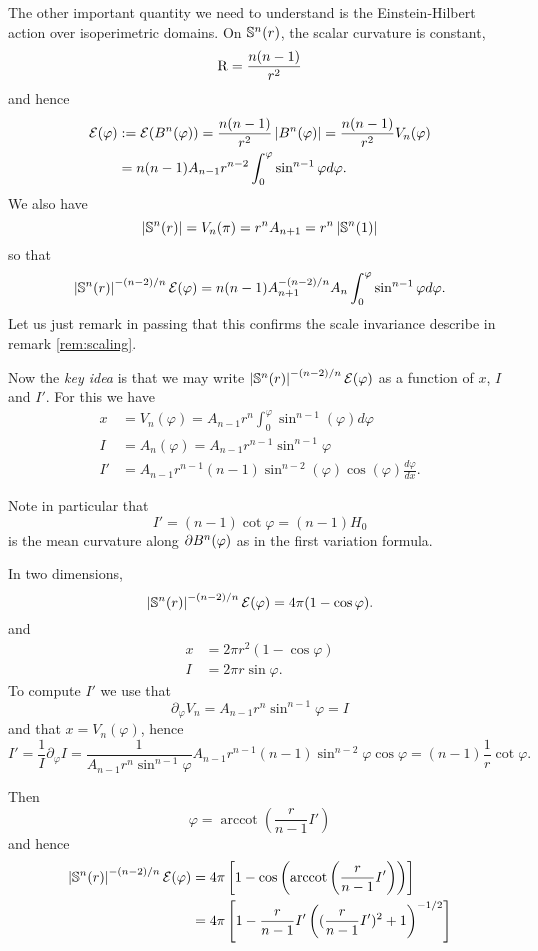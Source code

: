 \documentclass{amsart}
\begin{document}
The other important quantity we need to understand is the Einstein-Hilbert action over isoperimetric domains. On \(\S^n(r)\), the scalar curvature is constant,
\[
\Sc = \frac{n(n-1)}{r^2}
\]
and hence
\[
\begin{split}
\einsteinhilbert(\varphi) &:= \einsteinhilbert(B^n(\varphi)) = \frac{n(n-1)}{r^2} \abs{B^n(\varphi)} = \frac{n(n-1)}{r^2} V_n(\varphi) \\
&= n(n-1) A_{n-1} r^{n-2} \int_0^{\varphi} \sin^{n-1} \varphi d\varphi.
\end{split}
\]
We also have
\[
\abs{\S^n(r)} = V_n(\pi) = r^n A_{n+1} = r^n \abs{\S^n(1)}
\]
so that
\[
\abs{\S^n(r)}^{-(n-2)/n} \einsteinhilbert(\varphi) = n(n-1)A_{n+1}^{-(n-2)/n} A_n \int_0^{\varphi} \sin^{n-1} \varphi d\varphi.
\]
Let us just remark in passing that this confirms the scale invariance describe in remark \ref{rem:scaling}.

Now the \emph{key idea} is that we may write \(\abs{\S^n(r)}^{-(n-2)/n} \einsteinhilbert(\varphi)\) as a function of \(x\), \(I\) and \(I'\). For this we have
\begin{align*}
x &= V_n(\varphi) = A_{n-1} r^n \int_0^{\varphi} \sin^{n-1} (\varphi) d\varphi \\
I &= A_n(\varphi) = A_{n-1} r^{n-1} \sin^{n-1} \varphi \\
I' &= A_{n-1} r^{n-1} (n-1) \sin^{n-2} (\varphi) \cos(\varphi)\frac{d\varphi}{dx}.
\end{align*}

Note in particular that
\[
I' = (n-1) \cot \varphi = (n-1) H_0
\]
is the mean curvature along \(\bdry{B^n(\varphi)}\) as in the first variation formula.

In two dimensions,
\[
\abs{\S^n(r)}^{-(n-2)/n} \einsteinhilbert(\varphi) = 4\pi (1 - \cos\varphi).
\]
and
\begin{align*}
x &= 2\pi r^2 (1-\cos\varphi) \\
I &= 2\pi r \sin \varphi.
\end{align*}
To compute \(I'\) we use that
\[
\partial_{\varphi} V_n = A_{n-1} r^n \sin^{n-1} \varphi = I
\]
and that \(x = V_n(\varphi)\), hence
\[
I' = \frac{1}{I} \partial_{\varphi} I = \frac{1}{A_{n-1} r^n \sin^{n-1} \varphi} A_{n-1} r^{n-1} (n-1) \sin^{n-2} \varphi \cos \varphi = (n-1) \frac{1}{r} \cot \varphi.
\]

Then
\[
\varphi = \operatorname{arccot}\left(\frac{r}{n-1} I'\right)
\]
and hence
\[
\begin{split}
\abs{\S^n(r)}^{-(n-2)/n} \einsteinhilbert(\varphi) &= 4\pi \left[1 - \cos\left(\operatorname{arccot}\left(\frac{r}{n-1} I'\right)\right)\right] \\
&= 4\pi \left[1 - \frac{r}{n-1} I' \left((\frac{r}{n-1} I')^2 + 1\right)^{-1/2}\right]
\end{split}
\]
\end{document}
